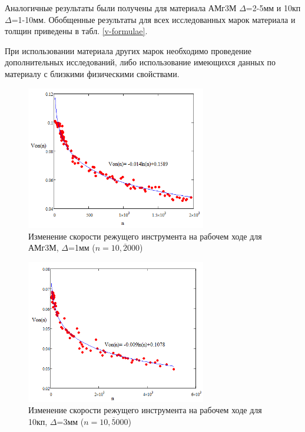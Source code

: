 \documentclass{article}
\begin{document}
Аналогичные результаты были получены для материала АМг3М $\Delta$=2-5мм и 10кп $\Delta$=1-10мм.
Обобщенные результаты для всех исследованных марок материала и толщин приведены в табл. \ref{v-formulae}.

При использовании материала других марок
необходимо проведение дополнительных исследований,
либо использование имеющихся данных по материалу
с близкими физическими свойствами.

\begin{figure}
  \begin{center}
  \includegraphics[width=0.7\textwidth]{amg3m.png}
  \caption{Изменение скорости режущего инструмента на рабочем ходе для АМг3М, $\Delta$=1мм ($n=\overline{10,2000}$)}
  \label{amg3m}
  \end{center}
\end{figure}


\begin{figure}
  \begin{center}
  \includegraphics[width=0.7\textwidth]{10kp.png}
  \caption{Изменение скорости режущего инструмента на рабочем ходе для 10кп, $\Delta$=3мм ($n=\overline{10,5000}$)}
  \label{10kp}
  \end{center}
\end{figure}
\end{document}
